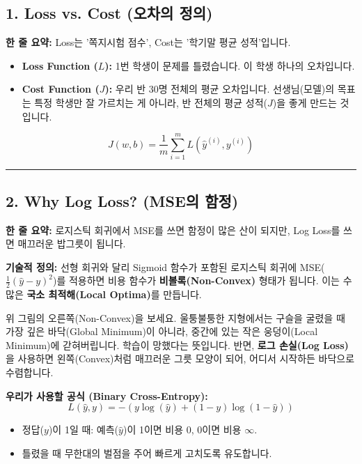\documentclass[11pt,a4paper]{book}
\theoremstyle{definition}
\begin{document}
\subsection{1. Loss vs. Cost (오차의 정의)}
\textbf{한 줄 요약:} Loss는 '쪽지시험 점수', Cost는 '학기말 평균 성적'입니다.

\begin{analogybox}[title={시험 점수 비유}]
\begin{itemize}
    \item \textbf{Loss Function ($L$):} 1번 학생이 문제를 틀렸습니다. 이 학생 하나의 오차입니다.
    \item \textbf{Cost Function ($J$):} 우리 반 30명 전체의 평균 오차입니다. 선생님(모델)의 목표는 특정 학생만 잘 가르치는 게 아니라, 반 전체의 평균 성적($J$)을 좋게 만드는 것입니다.
\end{itemize}
\end{analogybox}

$$ J(w, b) = \frac{1}{m} \sum_{i=1}^{m} L(\hat{y}^{(i)}, y^{(i)}) $$

\vspace{0.5cm}\hrule\vspace{0.5cm}

\subsection{2. Why Log Loss? (MSE의 함정)}
\textbf{한 줄 요약:} 로지스틱 회귀에서 MSE를 쓰면 함정이 많은 산이 되지만, Log Loss를 쓰면 매끄러운 밥그릇이 됩니다.

\textbf{기술적 정의:}
선형 회귀와 달리 Sigmoid 함수가 포함된 로지스틱 회귀에 MSE($\frac{1}{2}(\hat{y}-y)^2$)를 적용하면 비용 함수가 \textbf{비볼록(Non-Convex)} 형태가 됩니다. 이는 수많은 \textbf{국소 최적해(Local Optima)}를 만듭니다.


\begin{warningbox}[title={MSE를 쓰면 안 되는 이유}]
위 그림의 오른쪽(Non-Convex)을 보세요. 울퉁불퉁한 지형에서는 구슬을 굴렸을 때 가장 깊은 바닥(Global Minimum)이 아니라, 중간에 있는 작은 웅덩이(Local Minimum)에 갇혀버립니다. 학습이 망했다는 뜻입니다.
반면, \textbf{로그 손실(Log Loss)}을 사용하면 왼쪽(Convex)처럼 매끄러운 그릇 모양이 되어, 어디서 시작하든 바닥으로 수렴합니다.
\end{warningbox}

\textbf{우리가 사용할 공식 (Binary Cross-Entropy):}
$$ L(\hat{y}, y) = -(y \log(\hat{y}) + (1-y) \log(1-\hat{y})) $$
\begin{itemize}
    \item 정답($y$)이 1일 때: 예측($\hat{y}$)이 1이면 비용 0, 0이면 비용 $\infty$.
    \item 틀렸을 때 무한대의 벌점을 주어 빠르게 고치도록 유도합니다.
\end{itemize}
\end{document}
